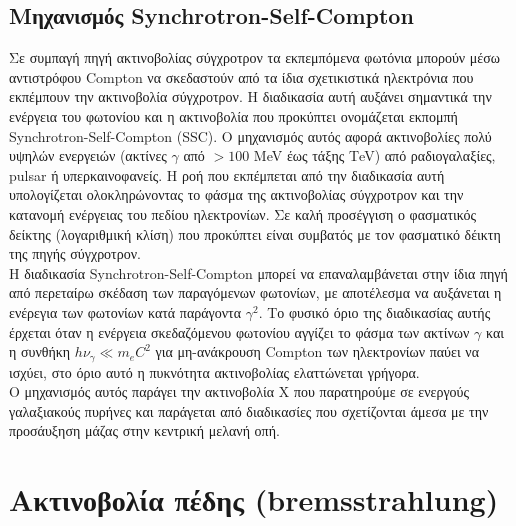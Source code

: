 \subsection*{Μηχανισμός \textlatin{Synchrotron-Self-Compton}}

Σε συμπαγή πηγή ακτινοβολίας σύγχροτρον τα εκπεμπόμενα φωτόνια μπορούν μέσω αντιστρόφου \textlatin{Compton} να σκεδαστούν από τα ίδια σχετικιστικά ηλεκτρόνια που εκπέμπουν την ακτινοβολία σύγχροτρον. Η διαδικασία αυτή αυξάνει σημαντικά την ενέργεια του φωτονίου και η ακτινοβολία που προκύπτει ονομάζεται εκπομπή \textlatin{Synchrotron-Self-Compton (SSC)}. Ο μηχανισμός αυτός αφορά ακτινοβολίες πολύ υψηλών ενεργειών (ακτίνες $\gamma$ από $>100$ \textlatin{MeV} έως τάξης \textlatin{ΤeV}) από ραδιογαλαξίες, \textlatin{pulsar} ή υπερκαινοφανείς. Η ροή που εκπέμπεται από την διαδικασία αυτή υπολογίζεται ολοκληρώνοντας το φάσμα της ακτινοβολίας σύγχροτρον και την κατανομή ενέργειας του πεδίου ηλεκτρονίων. Σε καλή προσέγγιση ο φασματικός δείκτης (λογαριθμική κλίση) που προκύπτει είναι συμβατός με τον φασματικό δέικτη της πηγής σύγχροτρον.\\
Η διαδικασία \textlatin{Synchrotron-Self-Compton} μπορεί να επαναλαμβάνεται στην ίδια πηγή από περεταίρω σκέδαση των παραγόμενων φωτονίων, με αποτέλεσμα να αυξάνεται η ενέρεγια των φωτονίων κατά παράγοντα $\gamma^2$. Το φυσικό όριο της διαδικασίας αυτής έρχεται όταν η ενέργεια σκεδαζόμενου φωτονίου αγγίζει το φάσμα των ακτίνων $\gamma$ και η συνθήκη $h \nu_\gamma \ll m_e C^2 $ για μη-ανάκρουση \textlatin{Compton} των ηλεκτρονίων παύει να ισχύει, στο όριο αυτό η πυκνότητα ακτινοβολίας ελαττώνεται γρήγορα\cite{netzer_2013}.\\
Ο μηχανισμός αυτός παράγει την ακτινοβολία Χ που παρατηρούμε σε ενεργούς γαλαξιακούς πυρήνες και παράγεται από διαδικασίες που σχετίζονται άμεσα με την προσάυξηση μάζας στην κεντρική μελανή οπή.


\section{Ακτινοβολία πέδης (\textlatin{bremsstrahlung})}

